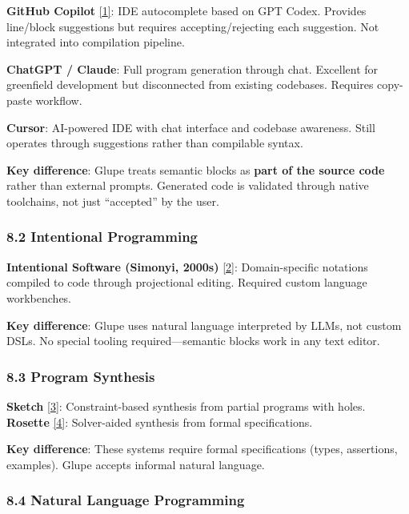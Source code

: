 \documentclass[11pt, a4paper]{article}
\begin{document}
\textbf{GitHub Copilot} \hyperref[references]{{[}1{]}}: IDE autocomplete
based on GPT Codex. Provides line/block suggestions but requires
accepting/rejecting each suggestion. Not integrated into compilation
pipeline.

\textbf{ChatGPT / Claude}: Full program generation through chat.
Excellent for greenfield development but disconnected from existing
codebases. Requires copy-paste workflow.

\textbf{Cursor}: AI-powered IDE with chat interface and codebase
awareness. Still operates through suggestions rather than compilable
syntax.

\textbf{Key difference}: Glupe treats semantic blocks as \textbf{part of
the source code} rather than external prompts. Generated code is
validated through native toolchains, not just ``accepted'' by the user.

\subsubsection{8.2 Intentional
Programming}\label{intentional-programming}

\textbf{Intentional Software (Simonyi, 2000s)}
\hyperref[references]{{[}2{]}}: Domain-specific notations compiled to
code through projectional editing. Required custom language workbenches.

\textbf{Key difference}: Glupe uses natural language interpreted by
LLMs, not custom DSLs. No special tooling required---semantic blocks
work in any text editor.

\subsubsection{8.3 Program Synthesis}\label{program-synthesis}

\textbf{Sketch} \hyperref[references]{{[}3{]}}: Constraint-based
synthesis from partial programs with holes.\\
\textbf{Rosette} \hyperref[references]{{[}4{]}}: Solver-aided synthesis
from formal specifications.

\textbf{Key difference}: These systems require formal specifications
(types, assertions, examples). Glupe accepts informal natural language.

\subsubsection{8.4 Natural Language
Programming}\label{natural-language-programming}
\end{document}
